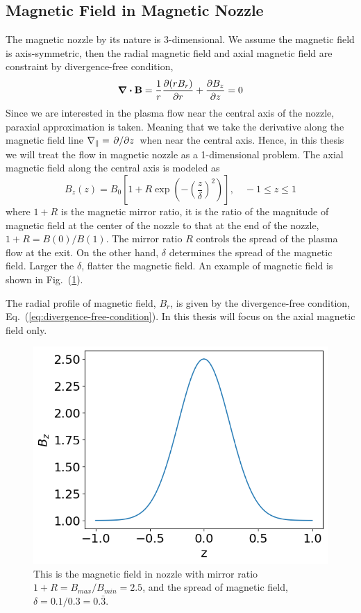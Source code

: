 \subsection{Magnetic Field in Magnetic Nozzle} \label{sec:magnetic-field-in-nozzle}
The magnetic nozzle by its nature is 3-dimensional. We assume the magnetic field is axis-symmetric, then the radial magnetic field and axial magnetic field are constraint by divergence-free condition,
\begin{equation}
	\div\mathbf{B} = \frac{1}{r}\pdv{(rB_r)}{r} + \pdv{B_z}{z} = 0
	\label{eq:divergence-free-condition}
\end{equation}
Since we are interested in the plasma flow near the central axis of the nozzle, paraxial approximation is taken. Meaning that we take the derivative along the magnetic field line $\nabla_\parallel = \pdv*{z}$ when near the central axis. Hence, in this thesis we will treat the flow in magnetic nozzle as a 1-dimensional problem. The axial magnetic field along the central axis is modeled as
\begin{equation}
	B_z(z) = B_0 \left[1 + R\exp(-\left(\frac{z}{\delta}\right)^2)\right], \quad -1\leq z \leq 1
\end{equation}
where $1+R$ is the magnetic mirror ratio, it is the ratio of the magnitude of magnetic field at the center of the nozzle to that at the end of the nozzle, $1+R = B(0)/B(1)$. The mirror ratio $R$ controls the spread of the plasma flow at the exit. On the other hand, $\delta$ determines the spread of the magnetic field. Larger the $\delta$, flatter the magnetic field. An example of magnetic field is shown in Fig.~(\ref{fig:magnetic-field}).

The radial profile of magnetic field, $B_r$, is given by the divergence-free condition, Eq.~(\ref{eq:divergence-free-condition}). In this thesis will focus on the axial magnetic field only.

\begin{figure}[htbp]
	\centering
	\includegraphics[width=0.7\linewidth]{figures/magnetic-field}
	\caption{This is the magnetic field in nozzle with mirror ratio $1+R=B_{max}/B_{min}=2.5$, and the spread of magnetic field, $\delta=0.1/0.3=0.\bar{3}$. }
	\label{fig:magnetic-field}
\end{figure}


